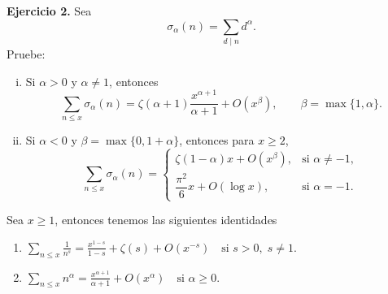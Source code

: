 \documentclass[12pt, a4paper]{article}
\begin{document}
\textbf{Ejercicio 2.} Sea
\[
	\sigma_\alpha(n)=\sum_{d\mid n} d^\alpha.
\]
Pruebe:
\begin{enumerate}[(i)]
	\item Si $\alpha>0$ y $\alpha\neq 1$, entonces
	      \[
		      \sum_{n\leq x}\sigma_\alpha(n)
		      =
		      \zeta(\alpha+1)\frac{x^{\alpha+1}}{\alpha+1}
		      +O\!\left(x^\beta\right),
		      \qquad
		      \beta=\max\{1,\alpha\}.
	      \]

	\item Si $\alpha<0$ y $\beta=\max\{0,1+\alpha\}$, entonces para $x\geq 2$,
	      \[
		      \sum_{n\leq x}\sigma_\alpha(n)
		      =
		      \begin{cases}
			      \zeta(1-\alpha)x+O(x^\beta), & \text{si } \alpha\neq -1, \\[1mm]
			      \dfrac{\pi^2}{6}x+O(\log x), & \text{si } \alpha=-1.
		      \end{cases}
	      \]
\end{enumerate}

\begin{lemma}
	Sea $x\geq 1$, entonces tenemos las siguientes identidades

	\begin{enumerate}[$\bullet$]
		\item
		      $\displaystyle\sum_{n \le x} \frac{1}{n^s}= \frac{x^{1-s}}{1-s} + \zeta(s) + O(x^{-s})\quad \text{si } s > 0,\; s \ne 1. $
		\item $\displaystyle\sum_{n \le x} n^\alpha
			      = \frac{x^{\alpha+1}}{\alpha+1} + O(x^\alpha)
			      \quad \text{si } \alpha \ge 0.$
	\end{enumerate}
\end{lemma}
\end{document}
